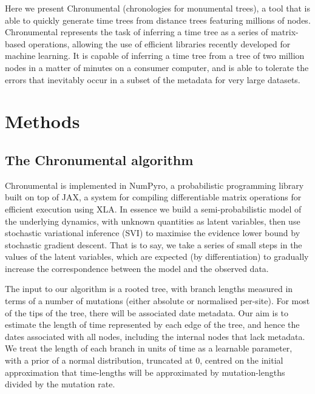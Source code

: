 Here we present Chronumental (chronologies for monumental trees), a tool that is able to quickly generate time trees from distance trees featuring millions of nodes. Chronumental represents the task of inferring a time tree as a series of matrix-based operations, allowing the use of efficient libraries recently developed for machine learning. It is capable of inferring a time tree from a tree of two million nodes in a matter of minutes on a consumer computer, and is able to tolerate the errors that inevitably occur in a subset of the metadata for very large datasets.


\section*{Methods}

\subsection*{The Chronumental algorithm}

Chronumental is implemented in NumPyro, a probabilistic programming library built on top of JAX, a system for compiling differentiable matrix operations for efficient execution using XLA. In essence we build a semi-probabilistic model of the underlying dynamics, with unknown quantities as latent variables, then use stochastic variational inference (SVI) to maximise the evidence lower bound by stochastic gradient descent. That is to say, we take a series of small steps in the values of the latent variables, which are expected (by differentiation) to gradually increase the correspondence between the model and the observed data.

The input to our algorithm is a rooted tree, with branch lengths measured in terms of a number of mutations (either absolute or normalised per-site). For most of the tips of the tree, there will be associated date metadata. Our aim is to estimate the length of time represented by each edge of the tree, and hence the dates associated with all nodes, including the internal nodes that lack metadata. We treat the length of each branch in units of time as a learnable parameter, with a prior of a normal distribution, truncated at 0, centred on the initial approximation that time-lengths will be approximated by mutation-lengths divided by the mutation rate. 

